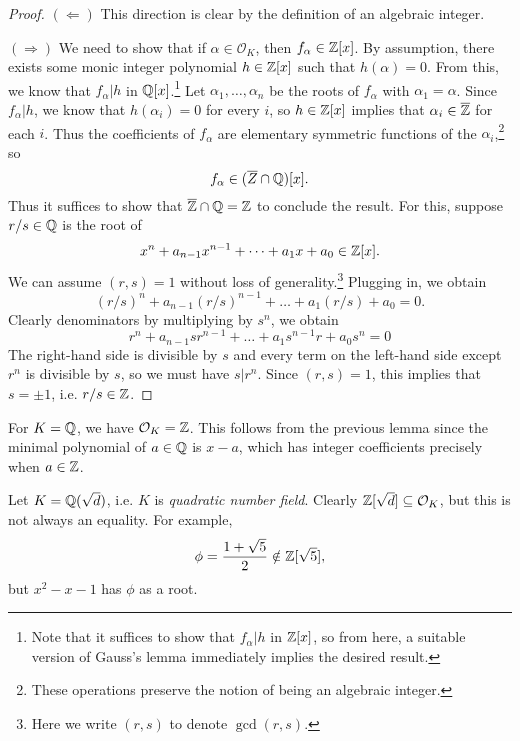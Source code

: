 \begin{proof}
  $(\Leftarrow)$ This direction is clear by the
  definition of an algebraic integer.

  $(\Rightarrow)$ We need to show that if
  $\alpha \in \mathcal{O}_K$, then $f_\alpha \in \mathbb{Z}[x]$.
  By assumption, there exists some monic integer
  polynomial $h \in \mathbb{Z}[x]$ such that $h(\alpha) = 0$.
  From this, we know that $f_\alpha | h$ in
  $\mathbb{Q}[x]$.\footnote{Note that it suffices to show that $f_\alpha | h$ in $\mathbb{Z}[x]$, so from here, a suitable version of Gauss's lemma immediately implies the desired result.}
  Let $\alpha_1, \dots, \alpha_n$ be the roots of
  $f_\alpha$ with $\alpha_1 = \alpha$. Since
  $f_\alpha | h$, we know that
  $h(\alpha_i) = 0$ for every $i$, so $h \in \mathbb{Z}[x]$
  implies that $\alpha_i \in \overline{\mathbb{Z}}$ for each $i$.
  Thus the coefficients of $f_\alpha$ are elementary
  symmetric functions of the $\alpha_i$,\footnote{These operations preserve the notion of being an algebraic integer.} so
  \[
    f_\alpha \in (\overline{Z} \cap \mathbb{Q})[x].
  \]
  Thus it suffices to show that $\overline{\mathbb{Z}} \cap \mathbb{Q} = \mathbb{Z}$ to conclude the result.
  For this, suppose $r / s \in \mathbb{Q}$ is the root of
  \[
    x^n + a_{n-1} x^{n-1} + \dots + a_1 x + a_0 \in \mathbb{Z}[x].
  \]
  We can assume $(r, s) = 1$ without loss of generality.\footnote{Here we write $(r, s)$ to denote $\gcd(r, s)$.}
  Plugging in, we obtain
  \[
    (r / s)^n + a_{n-1} (r / s)^{n-1} + \dots + a_1 (r / s) + a_0 = 0.
  \]
  Clearly denominators by multiplying by $s^n$, we
  obtain
  \[
    r^n + a_{n - 1} sr^{n - 1} + \dots + a_1 s^{n - 1} r + a_0 s^n = 0
  \]
  The right-hand side is divisible by $s$ and every
  term on the left-hand side except $r^n$ is divisible
  by $s$, so we must have $s | r^n$. Since $(r, s) = 1$,
  this implies that $s = \pm 1$, i.e. $r / s \in \mathbb{Z}$.
\end{proof}

\begin{example}
  For $K = \mathbb{Q}$, we have $\mathcal{O}_K = \mathbb{Z}$. This
  follows from the previous lemma since
  the minimal polynomial of $a \in \mathbb{Q}$ is $x - a$, which
  has integer coefficients precisely when $a \in \mathbb{Z}$.
\end{example}

\begin{example}
  Let $K = \mathbb{Q}(\sqrt{d})$, i.e. $K$ is \emph{quadratic number field}.
  Clearly $\mathbb{Z}[\sqrt{d}] \subseteq \mathcal{O}_K$,
  but this is not always an equality. For example,
  \[
    \phi = \frac{1 + \sqrt{5}}{2} \notin \mathbb{Z}[\sqrt{5}],
  \]
  but $x^2 - x - 1$ has $\phi$ as a root.
\end{example}

